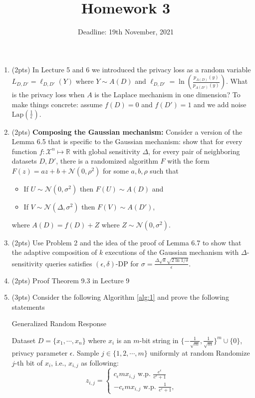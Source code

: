 \documentclass[11pt]{article}
\date{\displaydate{date}}
\begin{document}
\author{Deadline: 19th November, 2021}
\title{Homework 3}
\maketitle
\medskip
\begin{enumerate}

\item (2pts) In Lecture 5 and 6 we introduced the privacy loss as a random variable $L_{D, D'}=\ell_{D, D'}(Y)$ where $Y\sim A(D)$ and $\ell_{D, D'}=\ln(\frac{p_{A(D)}(y)}{p_{A(D')}(y)})$. What is the privacy loss  when $A$ is the Laplace mechanism in one
dimension? To make things concrete: assume $f(D)=0$ and $f(D')=1$ and we add noise $\text{Lap}(\frac{1}{\epsilon}).$

\item (2pts) {\bf Composing the Gaussian mechanism:} Consider a version of the Lemma 6.5 that is specific to the Gaussian mechanism: show
that for every function $f: \mathcal{X}^n \mapsto \mathbb{R}$ with global sensitivity $\Delta$, for every pair of neighboring
datasets $D, D'$, there is a randomized algorithm $F$ with the form $F(z)=az+b+\mathcal{N}(0, \rho^2)$ for some $a, b, \rho$ such that 
\begin{itemize}
	\item If $U\sim \mathcal{N}({0, \sigma^2})$ then $F(U)\sim A(D)$ and 
	\item If $V\sim \mathcal{N}({\Delta, \sigma^2})$ then $F(V) \sim A(D')$,  
\end{itemize}
where $A(D)=f(D)+Z$ where $Z\sim \mathcal{N}(0, \sigma^2)$.  

\item (2pts) Use Problem 2 and the idea of the proof of Lemma 6.7  to show that the adaptive composition of $k$ executions of the Gaussian mechanism with $\Delta$-sensitivity queries satisfies $(\epsilon, \delta)$-DP for $\sigma=\frac{\Delta\sqrt{k}\sqrt{2\ln 1/\delta }}{\epsilon}.$  
\item (2pts) Proof Theorem 9.3 in Lecture 9
\item (3pts) Consider the following Algorithm \ref{alg:1} and prove the following statements 
	\begin{algorithm}[!htbp]
    \caption{Generalized Random Response} 
    \label{alg:1}
    \begin{algorithmic}[1]
         Dataset $D=\{x_1,\cdots, x_n\}$ where $x_i$ is an $m$-bit string in $\{-\frac{1}{\sqrt{m}}, \frac{1}{\sqrt{m}}\}^m \cup \{0\}$, privacy parameter $\epsilon$.    
        \State Sample $j\in \{1, 2 ,\cdots, m\}$ uniformly at random
        \State Randomize $j$-th bit of $x_i$, i.e., $x_{i,j}$ as following:
        \begin{equation*}
        	z_{i,j}=        \begin{cases} c_\epsilon m x_{i,j} \text{ w.p. } \frac{e^\epsilon}{e^\epsilon+1} \\
        	-c_\epsilon m x_{i,j} \text{ w.p. } \frac{1}{e^\epsilon+1},
        	

\end{cases}
\end{equation*}
\end{algorithmic}
\end{algorithm}
\end{enumerate}
\end{document}
